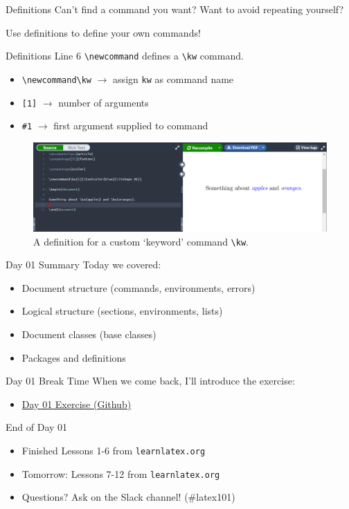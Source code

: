 \documentclass{beamer}
\begin{document}
{  \begin{frame}{Definitions}
    Can't find a command you want? Want to avoid repeating yourself? 

    Use definitions to define your own commands!
  \end{frame}

  \begin{frame}{Definitions}
    Line 6 \texttt{\textbackslash newcommand} defines a \texttt{\textbackslash kw} command.
    \begin{itemize}
      \item \texttt{\textbackslash newcommand\textbackslash kw} $\to$ assign \texttt{kw} as command name
      \item \texttt{[1]} $\to$ number of arguments
      \item \texttt{\#1} $\to$ first argument supplied to command
    \end{itemize}
    \begin{figure}
      \includegraphics[width=0.9\linewidth]{day01-overleaf-09A-defn.png}
      \caption{A definition for a custom `keyword' command \texttt{\textbackslash kw}.}
      \label{fig:day01-overleaf-09A}
    \end{figure}
  \end{frame}

  \begin{frame}{Day 01 Summary}
    Today we covered:
    \begin{itemize}
      \item Document structure (commands, environments, errors)
      \item Logical structure (sections, environments, lists)
      \item Document classes (base classes)
      \item Packages and definitions
    \end{itemize}
  \end{frame}

  \begin{frame}{Day 01 Break Time}
    When we come back, I'll introduce the exercise:
    \begin{itemize}
      \item \href{https://github.com/mdelrosa/latex101/blob/master/day01/exercise/day-01-exercise.pdf}{Day 01 Exercise (Github)}
    \end{itemize}
  \end{frame}

\begin{frame}{End of Day 01}
  \begin{itemize}
    \item Finished Lessons 1-6 from \texttt{learnlatex.org}
    \item Tomorrow: Lessons 7-12 from \texttt{learnlatex.org}
    \item Questions? Ask on the Slack channel! (\#latex101)
  \end{itemize}
\end{frame}

} %
\end{document}
